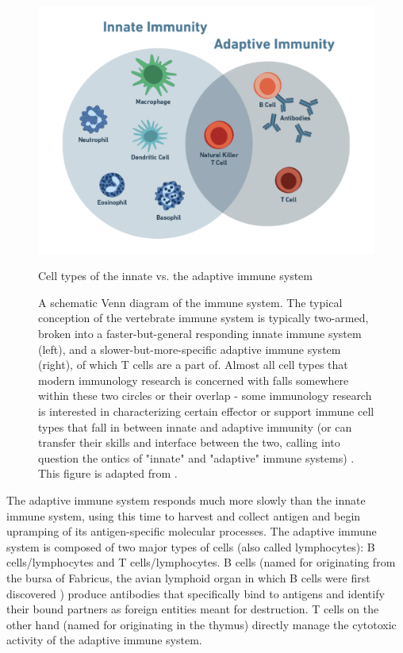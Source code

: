 \begin{figure}[htbp]
	\centering
	\includegraphics[width=\textwidth]{../figures/chapter1/innateadaptiveimmunesystem.png}
	\caption{Cell types of the innate vs. the adaptive immune system}
	\caption*{A schematic Venn diagram of the immune system. The typical conception of the vertebrate immune system is typically two-armed, broken into a faster-but-general responding innate immune system (left), and a slower-but-more-specific adaptive immune system (right), of which T cells are a part of. Almost all cell types that modern immunology research is concerned with falls somewhere within these two circles or their overlap - some immunology research is interested in characterizing certain effector or support immune cell types that fall in between innate and adaptive immunity (or can transfer their skills and interface between the two, calling into question the ontics of "innate" and "adaptive" immune systems) \cite{Heidegger1962}. This figure is adapted from \cite{Alam2007}.}
	\label{fig:innateadaptiveimmunesystem}
\end{figure}

The adaptive immune system responds much more slowly than the innate immune system, using this time to harvest and collect antigen and begin upramping of its antigen-specific molecular processes. The adaptive immune system is composed of two major types of cells (also called lymphocytes): B cells/lymphocytes and T cells/lymphocytes. B cells (named for originating from the bursa of Fabricus, the avian lymphoid organ in which B cells were first discovered \cite{Cooper2015}) produce antibodies that specifically bind to antigens and identify their bound partners as foreign entities meant for destruction. T cells on the other hand (named for originating in the thymus) directly manage the cytotoxic activity of the adaptive immune system. 

